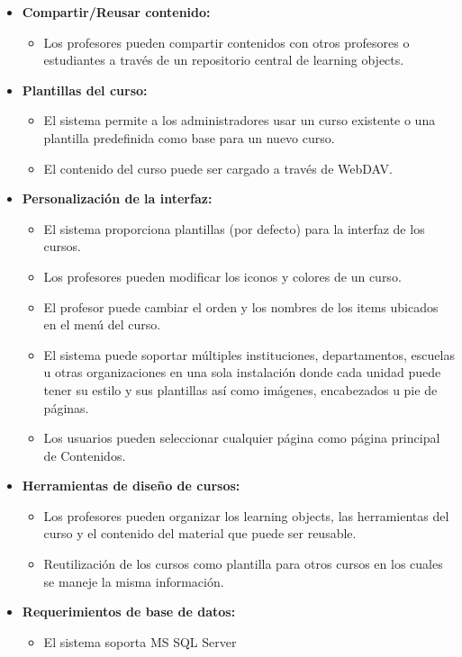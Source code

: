	\begin{itemize}
		\item \textbf{Compartir/Reusar contenido:}
			\begin{itemize}
				\item Los profesores pueden compartir contenidos con otros profesores o estudiantes a través de un repositorio central de learning objects.
			\end{itemize}
	\end{itemize}
	\begin{itemize}
		\item \textbf{Plantillas del curso:}
			\begin{itemize}
				\item El sistema permite a los administradores usar un curso existente o una plantilla predefinida como base para un nuevo curso.
				\item El contenido del curso puede ser cargado a través de WebDAV.
			\end{itemize}
	\end{itemize}
	\begin{itemize}
		\item \textbf{Personalización de la interfaz:}
			\begin{itemize}
				\item El sistema proporciona plantillas (por defecto) para la interfaz de los cursos.
				\item Los profesores pueden modificar los iconos y colores de un curso.
				\item El profesor puede cambiar el orden y los nombres de los items ubicados en el menú del curso.
				\item El sistema puede soportar múltiples instituciones, departamentos, escuelas u otras organizaciones en una sola instalación donde cada unidad puede tener su estilo y sus plantillas así como imágenes, encabezados u pie de páginas.
				\item Los usuarios pueden seleccionar cualquier página como página principal de Contenidos.
			\end{itemize}
	\end{itemize}
	\begin{itemize}
		\item \textbf{Herramientas de diseño de cursos:}
			\begin{itemize}
				\item Los profesores pueden organizar los learning objects, las herramientas del curso y el contenido del material que puede ser reusable.
				\item Reutilización de los cursos como plantilla para otros cursos en los cuales se maneje la misma información.
			\end{itemize}
	\end{itemize}
	\begin{itemize}
		\item \textbf{Requerimientos de base de datos:}
			\begin{itemize}
				\item El sistema soporta MS SQL Server
			\end{itemize}
	\end{itemize}
	
